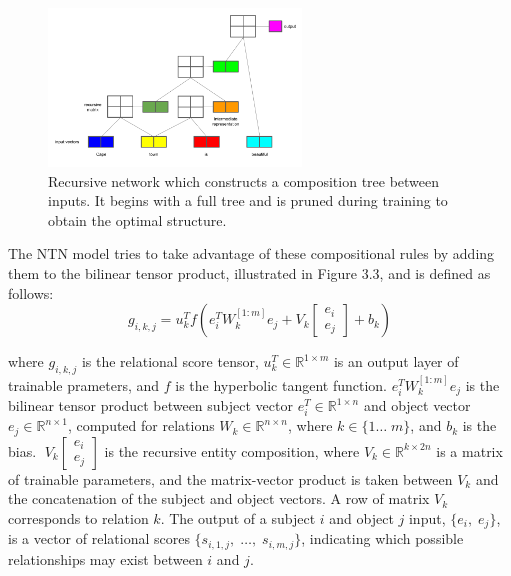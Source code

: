 \begin{figure}[H]
   	\centering
    	\includegraphics[width=0.6\textwidth, height=0.3\textwidth]{recursive_network.png}
	\captionsetup{justification=centering}
	\caption{Recursive network which constructs a composition tree between inputs. It begins with a full tree and is pruned during training to obtain the optimal structure.}
\end{figure}

\noindent The NTN model tries to take advantage of these compositional rules by adding them to the bilinear tensor product, illustrated in Figure 3.3, and is defined as follows:
\begin{equation}
	g_{i,k,j} =  u_k^Tf(e_i^TW_k^{\left [1:m \right ]} e_j + V_k \left [ \begin{matrix} e_i \\ e_j \end{matrix} \right ] + b_k)
\end{equation}

\noindent where $ g_{i,k,j} $ is the relational score tensor, $ u_k^T \in \mathbb{R}^{1 \times m} $ is an output layer of trainable prameters, and $ f $ is the hyperbolic tangent function. $ e_i^TW_k^{\left [1:m \right ]} e_j $ is the bilinear tensor product between subject vector $ e_i^T \in \mathbb{R}^{1 \times n} $ and object vector $ e_j \in \mathbb{R}^{n \times 1} $, computed for relations $ W_k \in \mathbb{R}^{n \times n} $, where $ k \in \{1 \dots \; m \} $, and $ b_k $ is the bias. $ \; V_k \left [ \begin{matrix} e_i \\ e_j \end{matrix} \right ] $ is the recursive entity composition, where $ V_k \in \mathbb{R}^{k \times 2n} $ is a matrix of trainable parameters, and the matrix-vector product is taken between $ V_k $ and the concatenation of the subject and object vectors. A row of matrix $ V_k $ corresponds to relation $ k $. The output of a subject $ i $ and object $ j $ input, $ \{ e_i, \; e_j \} $, is a vector of relational scores $ \{ s_{i,1,j}, \; \dots, \; s_{i,m,j} \} $, indicating which possible relationships may exist between $ i $ and $ j $. 


